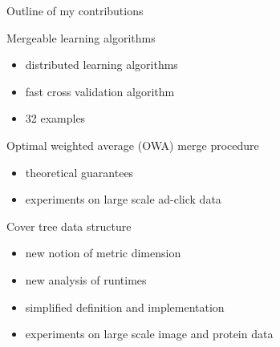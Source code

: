 \newcommand{\new}{(new)}

\begin{frame}{Outline of my contributions}

Mergeable learning algorithms
\begin{itemize}
    \item distributed learning algorithms
    \item fast cross validation algorithm
    \item 32 examples 
\end{itemize}

\vspace{0.1in}
Optimal weighted average (OWA) merge procedure
\begin{itemize}
    \item theoretical guarantees
    \item experiments on large scale ad-click data
\end{itemize}

\vspace{0.1in}
Cover tree data structure
\begin{itemize}
    \item new notion of metric dimension 
    \item new analysis of runtimes
    \item simplified definition and implementation
    \item experiments on large scale image and protein data
\end{itemize}
\end{frame}

